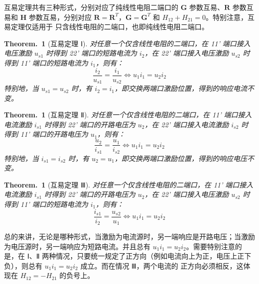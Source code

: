 \documentclass[UTF8]{report}
\theoremstyle{MyLineTheoremStyle} %
\theoremstyle{MyBlockTheoremStyle} %
\newtheorem{BlockTheorem}[LineTheorem]{Theorem.\,} %
\theoremstyle{MySubsubsectionStyle} %
\begin{document}
互易定理共有三种形式，分别对应了纯线性电阻二端口的 $\boldsymbol{G}$ 参数互易、$\boldsymbol{R}$ 参数互易和 $\boldsymbol{H}$ 参数互易，分别对应 $\boldsymbol{R} = \boldsymbol{R}^T$，$\boldsymbol{G} = \boldsymbol{G}^T$ 和 $H_{12} + H_{21} = 0$。特别注意，互易定理仅适用于 {\color{red} 只含线性电阻的二端口}，也即纯线性电阻二端口。


\begin{BlockTheorem}[互易定理 Ⅰ]\label{互易定理 Ⅰ}
对任意一个仅含线性电阻的二端口，在 11' 端口接入电压激励 $u_{s1}$ 时得到 22' 端口的短路电流为 $i_2$，在 22' 端口接入电压激励 $u_{s2}$ 时得到 11' 端口的短路电流为 $i_1$，则有：
\begin{equation}
\frac{i_2}{u_{s1}} = \frac{i_1}{u_{s2}} \Longleftrightarrow u_1 i_{1} = u_2 i_{2}
\end{equation}
特别地，当 $u_{s1} = u_{s2}$ 时，有 $i_2 = i_1$，即交换两端口激励位置，得到的响应电流不变。
\end{BlockTheorem}

\begin{BlockTheorem}[互易定理 Ⅱ]\label{互易定理 Ⅱ}
对任意一个仅含线性电阻的二端口，在 11' 端口接入电流激励 $i_{s1}$ 时得到 22' 端口的开路电压为 $u_2$，在 22' 端口接入电流激励 $i_{s2}$ 时得到 11' 端口的开路电压为 $u_1$，则有：
\begin{equation}
\frac{u_2}{i_{s1}} = \frac{u_1}{i_{s2}} \Longleftrightarrow u_{1} i_1 = u_{2} i_2
\end{equation}
特别地，当 $i_{s1} = i_{s2}$ 时，有 $u_2 = u_1$，即交换两端口激励位置，得到的响应电压不变。
\end{BlockTheorem}

\begin{BlockTheorem}[互易定理 Ⅲ]\label{互易定理 Ⅲ}
    对任意一个仅含线性电阻的二端口，在 11' 端口接入电流激励 $i_{s1}$ 时得到 22' 端口的开路电压为 $u_2$，在 22' 端口接入电压激励 $u_{s2}$ 时得到 11' 端口的短路电流为 $i_1$，则有：
    \begin{equation}
        \frac{i_{s1}}{i_2} = \frac{u_{s2}}{u_{1}} \Longleftrightarrow u_{1} i_1 = u_{2} i_2
    \end{equation}
\end{BlockTheorem}

总的来讲，无论是哪种形式，当激励为电流源时，另一端响应是开路电压；当激励为电压源时，另一端响应为短路电流。并且总有 $u_1i_1 = u_2 i_2$。需要特别注意的是，在 Ⅰ、Ⅱ 两种情况，只要统一规定了正方向（例如电流向上为正，电压上正下负），则总有 $u_1i_1 = u_2 i_2$ 成立。而在情况 Ⅲ，两个电流的 {\color{red} 正方向必须相反}，这体现在 $H_{12} = - H_{21}$ 的负号上。
\end{document}
